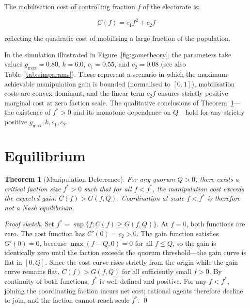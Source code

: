 \documentclass[12pt,a4paper,oneside]{report}
\newtheorem{theorem}{Theorem}[chapter]
\begin{document}
The mobilisation cost of controlling fraction $f$ of the electorate is:

\begin{equation}
  \label{eq:cost}
  C(f) = c_1 f^2 + c_2 f
\end{equation}

reflecting the quadratic cost of mobilising a large fraction of the population.

In the simulation illustrated in Figure~\ref{fig:gametheory}, the parameters take values $g_{\max} = 0.80$, $k = 6.0$, $c_1 = 0.55$, and $c_2 = 0.08$ (see also Table~\ref{tab:simparams}). These represent a scenario in which the maximum achievable manipulation gain is bounded (normalised to $[0,1]$), mobilisation costs are convex-dominant, and the linear term $c_2 f$ ensures strictly positive marginal cost at zero faction scale. The qualitative conclusions of Theorem~\ref{thm:manipulation}---the existence of $f^{*} > 0$ and its monotone dependence on $Q$---hold for any strictly positive $g_{\max}, k, c_1, c_2$.

\section{Equilibrium}

\begin{theorem}[Manipulation Deterrence]
\label{thm:manipulation}
For any quorum $Q > 0$, there exists a critical faction size $f^* > 0$ such that for all $f < f^*$, the manipulation cost exceeds the expected gain: $C(f) > G(f, Q)$. Coordination at scale $f < f^*$ is therefore not a Nash equilibrium.
\end{theorem}

\begin{proof}[Proof sketch]
Set $f^* = \sup\{f : C(f) \geq G(f, Q)\}$. At $f = 0$, both functions are zero. The cost function has $C'(0) = c_2 > 0$. The gain function satisfies $G'(0) = 0$, because $\max(f - Q, 0) = 0$ for all $f \leq Q$, so the gain is identically zero until the faction exceeds the quorum threshold---the gain curve is flat in $[0, Q]$. Since the cost curve rises strictly from the origin while the gain curve remains flat, $C(f) > G(f, Q)$ for all sufficiently small $f > 0$. By continuity of both functions, $f^*$ is well-defined and positive. For any $f < f^*$, joining the coordinating faction incurs net cost; rational agents therefore decline to join, and the faction cannot reach scale $f^*$. \qed
\end{proof}
\end{document}
